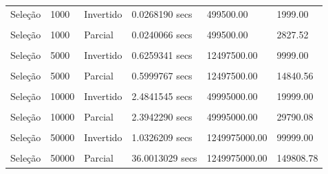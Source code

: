 \documentclass[
]{article}
\begin{document}
\begin{longtable}[l]{llllll}
Seleção & 1000 & Invertido & 0.0268190 secs & 499500.00 & 1999.00\\
\cellcolor{gray!15}{Seleção} & \cellcolor{gray!15}{1000} & \cellcolor{gray!15}{Ordenado} & \cellcolor{gray!15}{0.0241041 secs} & \cellcolor{gray!15}{499500.00} & \cellcolor{gray!15}{999.00}\\
Seleção & 1000 & Parcial & 0.0240066 secs & 499500.00 & 2827.52\\
\cellcolor{gray!15}{Seleção} & \cellcolor{gray!15}{5000} & \cellcolor{gray!15}{Aleatório} & \cellcolor{gray!15}{0.5993001 secs} & \cellcolor{gray!15}{12497500.00} & \cellcolor{gray!15}{14980.26}\\
Seleção & 5000 & Invertido & 0.6259341 secs & 12497500.00 & 9999.00\\
\cellcolor{gray!15}{Seleção} & \cellcolor{gray!15}{5000} & \cellcolor{gray!15}{Ordenado} & \cellcolor{gray!15}{0.5981762 secs} & \cellcolor{gray!15}{12497500.00} & \cellcolor{gray!15}{4999.00}\\
Seleção & 5000 & Parcial & 0.5999767 secs & 12497500.00 & 14840.56\\
\cellcolor{gray!15}{Seleção} & \cellcolor{gray!15}{10000} & \cellcolor{gray!15}{Aleatório} & \cellcolor{gray!15}{2.3946125 secs} & \cellcolor{gray!15}{49995000.00} & \cellcolor{gray!15}{29979.50}\\
Seleção & 10000 & Invertido & 2.4841545 secs & 49995000.00 & 19999.00\\
\cellcolor{gray!15}{Seleção} & \cellcolor{gray!15}{10000} & \cellcolor{gray!15}{Ordenado} & \cellcolor{gray!15}{2.3931191 secs} & \cellcolor{gray!15}{49995000.00} & \cellcolor{gray!15}{9999.00}\\
Seleção & 10000 & Parcial & 2.3942290 secs & 49995000.00 & 29790.08\\
\cellcolor{gray!15}{Seleção} & \cellcolor{gray!15}{50000} & \cellcolor{gray!15}{Aleatório} & \cellcolor{gray!15}{40.1216324 secs} & \cellcolor{gray!15}{1249975000.00} & \cellcolor{gray!15}{149976.26}\\
Seleção & 50000 & Invertido & 1.0326209 secs & 1249975000.00 & 99999.00\\
\cellcolor{gray!15}{Seleção} & \cellcolor{gray!15}{50000} & \cellcolor{gray!15}{Ordenado} & \cellcolor{gray!15}{59.9039979 secs} & \cellcolor{gray!15}{1249975000.00} & \cellcolor{gray!15}{49999.00}\\
Seleção & 50000 & Parcial & 36.0013029 secs & 1249975000.00 & 149808.78\\*
\end{longtable}
\end{document}
